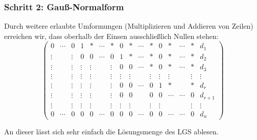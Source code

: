 %
%
\begin{frame}\frametitle{Schritt 2: Gau{\ss}-Normalform}

	Durch weitere erlaubte Umformungen (Multiplizieren und Addieren von Zeilen) erreichen wir, dass oberhalb der Einsen ausschlie{\ss}lich Nullen stehen:
	$$
		\left(
		\begin{array}{ccccccccccccccc|c}
			0		&\cdots 	& 0 		& 1 		& *		& \cdots 	& *		& 0		& *		&  \cdots	& *		& 0		& *		& \cdots	& * 		& d_1\\
			\vdots 	& 		& \vdots 	& 0 		& 0		& \cdots	& 0		& 1		& * 		& \cdots 	& * 		& 0		& *		& \cdots	& *		& d_2\\
			\vdots 	&  		&\vdots 	& \vdots  	& \vdots    & 	   	& \vdots	& 0		& 0		& \cdots	& *		& 0		& *		& \cdots	& *		& d_3\\			
			\vdots 	&  		&\vdots 	& \vdots  	& \vdots    & 	   	& \vdots	& \vdots	& \vdots	& 		& \vdots	& \vdots	& \vdots	&		& \vdots	& \vdots\\		
			\vdots 	&  		&\vdots 	& \vdots  	& \vdots    & 	   	& \vdots	& 0		& 0		& \cdots	& 0		& 1 		& *		&		& *		& d_r\\	
			\vdots 	&  		&\vdots 	& \vdots  	& \vdots    & 	   	& \vdots	& 0		& 0		& 		& 0		& 0		& \cdots	& \cdots	& 0		& d_{r+1}\\	
			\vdots 	&  		&\vdots 	& \vdots  	& \vdots    & 	   	& \vdots	& \vdots	& \vdots	& 		&\vdots	& \vdots	& 		& 		& \vdots	& \vdots\\				
			0		&\cdots 	& 0 		& 0 		& 0 		& \cdots 	& 0 		& 0		& 0		& \cdots	& 0		& 0		& \cdots	& \cdots	& 0		& d_n
		\end{array}
		\right)
	$$
	
	\pause
	\vspace{2mm}
	An dieser  lässt sich sehr einfach die Lösungsmenge des LGS ablesen.
	
\end{frame}
%
%

